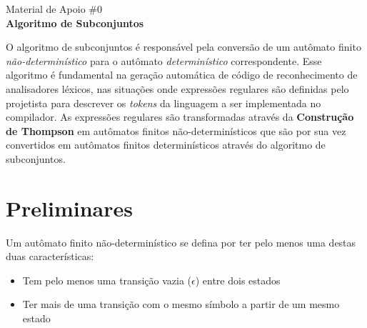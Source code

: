 \documentclass{compiladores}
\newcommand{\vazio}{{\LARGE$\epsilon$}\xspace}
\begin{document}
\begin{center}
{\LARGE Material de Apoio \#0} \\
{\bf Algoritmo de Subconjuntos}
\end{center}

O algoritmo de subconjuntos é responsável pela conversão de um
autômato finito \emph{não-determinístico} para o autômato
\emph{determinístico} correspondente. Esse algoritmo é fundamental na
geração automática de código de reconhecimento de analisadores
léxicos, nas situações onde expressões regulares são definidas pelo
projetista para descrever os \emph{tokens} da linguagem a ser
implementada no compilador. As expressões regulares são transformadas
através da {\bf Construção de Thompson} em autômatos finitos
não-determinísticos que são por sua vez convertidos em autômatos
finitos determinísticos através do algoritmo de subconjuntos.

\section{Preliminares}

Um autômato finito não-determinístico se defina por ter pelo
menos uma destas duas características:
\begin{itemize}
\item Tem pelo menos uma transição vazia (\vazio) entre dois
  estados \\


\item Ter mais de uma transição com o mesmo símbolo a partir de um
  mesmo estado \\
\end{itemize}
\end{document}
